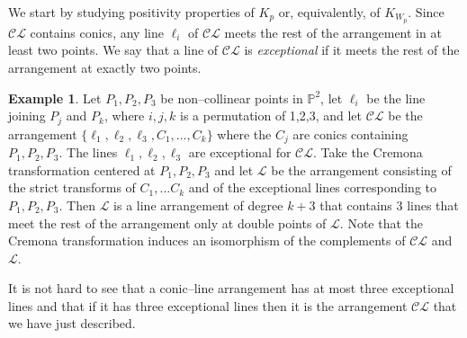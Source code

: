 \documentclass[12pt]{amsart}
\theoremstyle{plain}
\theoremstyle{definition}
\newtheorem{example}[thm]{Example}
\newcommand\pp[1]{\todo[color=cyan!50]{#1}} %
\newcommand\CL{\mathcal{CL}}
\renewcommand\pp{\mathbb P}
\begin{document}
We start by studying positivity properties of $K_p$ or, equivalently, of $K_{W_p}$. Since $\mathcal{CL}$ contains conics,  any line $\ell_i$ of $\mathcal{CL}$ meets the rest of the arrangement in at least two points. We say that a line of $\mathcal{CL}$ is {\em exceptional} if it meets the rest of the arrangement at exactly two points.
\begin{example}\label{ex: exceptional}
 Let $P_1,P_2, P_3$ be non--collinear points in $\pp^2$,  let $\ell_i$ be the line joining $P_j$ and $P_k$, where $i,j,k$ is a permutation of 1,2,3, and let $\mathcal{CL}$ be the arrangement $\{\ell_1,\ell_2,\ell_3, C_1,\ldots,C_k\}$ where the $C_j$ are conics containing $P_1,P_2,P_3$. The lines $\ell_1,\ell_2,\ell_3$ are exceptional for $\CL$. Take the Cremona transformation centered at $P_1, P_2,P_3$ and let $\mathcal L$ be the  arrangement consisting of the strict transforms of $C_1,\dots C_k$ and of the exceptional lines corresponding to $P_1,P_2, P_3$. 
Then $\mathcal L$ is a line arrangement  of degree $k+3$ that contains 3 lines that meet the rest of the arrangement only at double points of $\mathcal L$. Note that the Cremona transformation induces an isomorphism of the complements of $\CL$ and $\mathcal L$.

 
 It is not hard to see that a conic--line arrangement has at most three exceptional lines and that if it has three exceptional lines then it is the arrangement $\CL$ that we have just described.
 \end{example}
\end{document}
